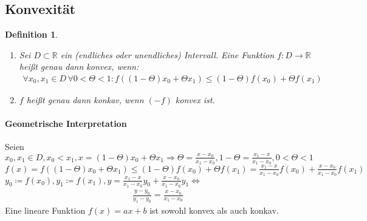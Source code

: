 \documentclass[ngerman,titlepage,twoside, parskip=half*]{scrreprt}
\newcommand*{\R}{\mathbb{R}}
\theoremstyle{break}
\newtheorem{definition}{Definition}[chapter]
\theoremstyle{nonumberbreak}
\begin{document}
\subsection{Konvexität}
\begin{definition}
  \begin{enumerate}[(1)]
    \item Sei $D\subset\R$ ein (endliches oder unendliches) Intervall.
      Eine Funktion $f\colon D\rightarrow\R$ heißt genau dann \emph{konvex}, wenn:
      \begin{gather*}\forall x_0,x_1\in D\,\forall 0<\Theta<1\colon f( (1-\Theta)x_0+\Theta x_1)\leq(1-\Theta)f(x_0)+\Theta f(x_1)\end{gather*}
    \item $f$ heißt genau dann
      \emph{konkav}, wenn $(-f)$
      konvex ist.
  \end{enumerate}
\end{definition}
  
\paragraph{Geometrische Interpretation}
Seien $x_0,x_1\in D, x_0<x_1, x=(1-\Theta)x_0+\Theta x_1\Rightarrow
\Theta=\frac{x-x_0}{x_1-x_0}, 1-\Theta=\frac{x_1-x}{x_1-x_0}, 0<\Theta<1$\\
$f(x)=f( (1-\Theta)x_0+\Theta x_1)\leq (1-\Theta)f(x_0)+\Theta f(x_1)
=\frac{x_1-x}{x_1-x_0}f(x_0)+\frac{x-x_0}{x_1-x_0}f(x_1)$\\
$y_0\coloneqq f(x_0), y_1\coloneqq f(x_1), y=\frac{x_1-x}{x_1-x_0}y_0+\frac{x-x_0}{x_1-x_0}y_1
\Leftrightarrow$
\begin{gather*}\frac{y-y_0}{y_1-y_0}=\frac{x-x_0}{x_1-x_0}\end{gather*}
Eine lineare Funktion $f(x)=ax+b$ ist sowohl konvex als auch konkav.
\end{document}
